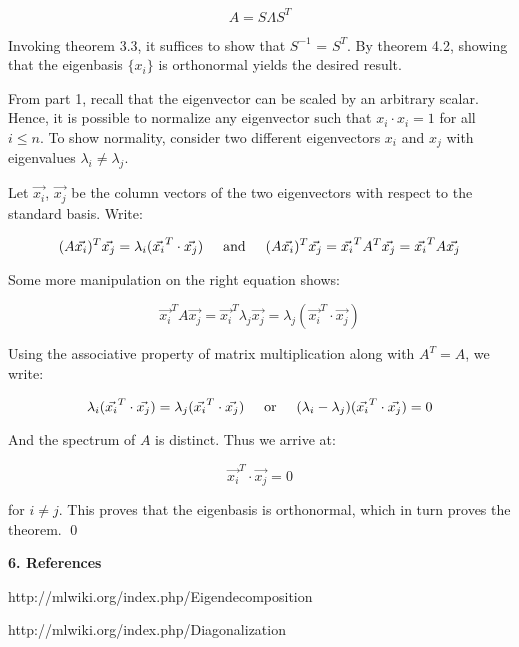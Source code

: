 \documentclass{article}
\newcommand{\textOr}{
    {
        \hspace{5mm}
        \textrm{or}
        \hspace{5mm}
    }
}
\newcommand{\textAnd}{
    {
        \hspace{5mm}
        \textrm{and}
        \hspace{5mm}
    }
}
\begin{document}
\[
    A = S \Lambda S^T
\]

\proof Invoking theorem 3.3, it suffices to show that $S^{-1}$ = $S^T$. 
By theorem 4.2, showing that the eigenbasis $\{x_i\}$ is orthonormal 
yields the desired result. 

From part 1, recall that the eigenvector 
can be scaled by an arbitrary scalar. Hence, it is possible to normalize 
any eigenvector such that $x_i\cdot x_i = 1$ for all $i\leq n$. 
To show normality, consider two different eigenvectors $x_i$ and 
$x_j$ with eigenvalues $\lambda_i \neq \lambda_j$. 

Let $\vec{x_i}$, $\vec{x_j}$ be the column vectors of the two eigenvectors 
with respect to the standard basis. Write:

\[
    (A\vec{x_i})^T\vec{x_j} = \lambda_i(\vec{x_i}^T \cdot \vec{x_j}) 
    \textAnd 
   (A\vec{x_i})^T\vec{x_j}  = \vec{x_i}^TA^T\vec{x_j} 
   =\vec{x_i}^TA\vec{x_j}
\]

Some more manipulation on the right equation shows:

\[
    \vec{x_i}^TA\vec{x_j} = \vec{x_i}^T\lambda_j\vec{x_j}
    =\lambda_j(\vec{x_i}^T\cdot\vec{x_j})
\]

Using the associative property of matrix multiplication along with 
$A^T = A$, we write:

\[
    \lambda_i(\vec{x_i}^T\cdot\vec{x_j}) =\lambda_j(\vec{x_i}^T\cdot\vec{x_j}) 
    \textOr 
    (\lambda_i - \lambda_j)(\vec{x_i}^T\cdot\vec{x_j}) = 0
\]

And the spectrum of $A$ is distinct. Thus we arrive at:

\[
    \vec{x_i}^T\cdot\vec{x_j} = 0
\]

for $i \neq j$. This proves that the eigenbasis is orthonormal, which 
in turn proves the theorem. 
\qed

\vspace{15mm}

\textbf{6. References} 

http://mlwiki.org/index.php/Eigendecomposition

http://mlwiki.org/index.php/Diagonalization
\end{document}
